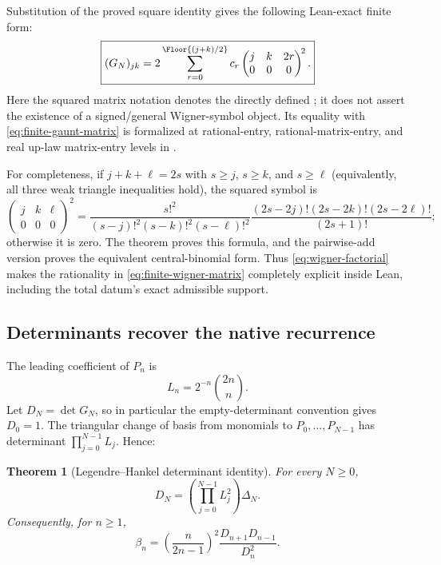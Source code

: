 \documentclass[11pt,oneside]{article}
\newtheorem{theorem}{Theorem}[section]
\theoremstyle{definition}
\theoremstyle{remark}
\numberwithin{equation}{section}
\begin{document}
Substitution of the proved square identity gives the following Lean-exact finite form:
\begin{equation}
 \boxed{
 (G_N)_{jk}=
 2\sum_{r=0}^{\Floor{(j+k)/2}}c_r
 \begin{pmatrix}j&k&2r\\0&0&0\end{pmatrix}^{\!2}.}
 \label{eq:finite-wigner-matrix}
\end{equation}
Here the squared matrix notation denotes the directly defined
; it does not assert the existence of a
signed/general Wigner-symbol object.  Its equality with
\cref{eq:finite-gaunt-matrix} is formalized at rational-entry,
rational-matrix-entry, and real up-law matrix-entry levels in
.

For completeness, if $j+k+\ell=2s$ with $s\ge j$, $s\ge k$, and $s\ge\ell$
(equivalently, all three weak triangle inequalities hold), the squared symbol is
\begin{equation}
 \begin{pmatrix}j&k&\ell\\0&0&0\end{pmatrix}^{\!2}
 =\frac{s!^2}{(s-j)!^2(s-k)!^2(s-\ell)!^2}
  \frac{(2s-2j)!(2s-2k)!(2s-2\ell)!}{(2s+1)!};
 \label{eq:wigner-factorial}
\end{equation}
otherwise it is zero.  The theorem
 proves this formula,
and the pairwise-add version proves the equivalent central-binomial form.  Thus
\cref{eq:wigner-factorial} makes the rationality in
\cref{eq:finite-wigner-matrix} completely explicit inside Lean, including the
total datum's exact admissible support.

\subsection{Determinants recover the native recurrence}
The leading coefficient of $P_n$ is
\begin{equation}
 L_n=2^{-n}\binom{2n}{n}.
 \label{eq:legendre-leading}
\end{equation}
Let $D_N=\det G_N$, so in particular the empty-determinant convention gives
$D_0=1$.  The triangular change of basis from monomials to
$P_0,\ldots,P_{N-1}$ has determinant $\prod_{j=0}^{N-1}L_j$.  Hence:

\begin{theorem}[Legendre--Hankel determinant identity]
\label{thm:legendre-hankel}
For every $N\ge0$,
\begin{equation}
 \boxed{
 D_N=\left(\prod_{j=0}^{N-1}L_j^2\right)\Delta_N.}
 \label{eq:legendre-hankel}
\end{equation}
Consequently, for $n\ge1$,
\begin{equation}
 \boxed{
 \beta_n=
 \left(\frac{n}{2n-1}\right)^2
 \frac{D_{n+1}D_{n-1}}{D_n^2}.}
 \label{eq:beta-gaunt-determinants}
\end{equation}
\end{theorem}
\end{document}
